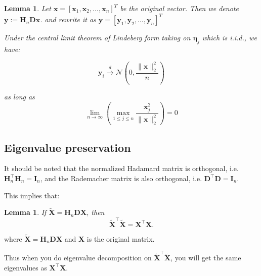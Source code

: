 \documentclass[11pt]{article}
\numberwithin{equation}{section}
\theoremstyle{plain}
\newtheorem{lemma}[theorem]{Lemma}
\theoremstyle{definition}
\theoremstyle{remark}
\begin{document}
\begin{lemma}
  \label{lem:asymptotic-normality}
  Let $\mathbf{x} = [\mathbf{x}_1, \mathbf{x}_2, \ldots, \mathbf{x}_n]^T$ be the original vector. 
  Then we denote $\mathbf{y}:=\mathbf{H}_n\mathbf{D}\mathbf{x}$.
  and rewrite it as $\mathbf{y} = [\mathbf{y}_1, \mathbf{y}_2, \ldots, \mathbf{y}_n]^T$
  
  Under the central limit theorem of Lindeberg form taking on $\mathbf{\eta}_{j}$ which is i.i.d., we have:

  \[
  \mathbf{y}_{i} \xrightarrow{\;d\;} \mathcal N\left(0,\frac{\|\mathbf{x}\|_2^2}{n}\right)\tag{6.5}\label{eq:6.6}
  \]

  as long as
  \[
  \lim_{n\to\infty}\left(\max_{1\leq j\leq n}\frac{\mathbf{x}_j^2}{\|\mathbf{x}\|_2^2}\right)=0 \tag{6.6} \label{eq:6.6}
  \]
\end{lemma}

\subsection{Eigenvalue preservation}
It should be noted that the normalized Hadamard matrix is orthogonal, i.e. $\mathbf{H}_n^{\top}\mathbf{H}_n = \mathbf{I}_n$, and the Rademacher matrix is also orthogonal, i.e. $\mathbf{D}^{\top}\mathbf{D} = \mathbf{I}_n$.

This implies that:
\begin{lemma}
    \label{lem:eigenvalue-preservation}
    If $\mathbf{\tilde{X}} = \mathbf{H}_n\mathbf{D}\mathbf{X}$, then
    \[
    \mathbf{\tilde{X}}^{\top}\mathbf{\tilde{X}} = \mathbf{X}^{\top}\mathbf{X}. \tag{6.7}\label{eq:6.7}
    \]
\end{lemma}

where $\mathbf{\tilde{X}} = \mathbf{H}_n\mathbf{D}\mathbf{X}$ and $\mathbf{X}$ is the original matrix.

Thus when you do eigenvalue decomposition on $\mathbf{\tilde{X}}^{\top}\mathbf{\tilde{X}}$, you will get the same eigenvalues as $\mathbf{X}^{\top}\mathbf{X}$.
\end{document}
